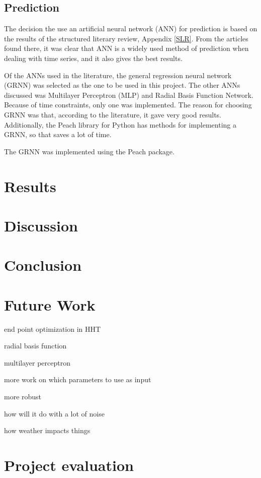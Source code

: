 \documentclass[12pt]{article}
\begin{document}
\subsection{Prediction}
\label{prediction}
The decision the use an artificial neural network (ANN) for prediction is based on the results of the structured literary review, Appendix \ref{SLR}. From the articles found there, it was clear that ANN is a widely used method of prediction when dealing with time series, and it also gives the best results. 

Of the ANNs used in the literature, the general regression neural network (GRNN) was selected as the one to be used in this project. The other ANNs discussed was Multilayer Perceptron (MLP) and Radial Basis Function Network. Because of time constraints, only one was implemented. The reason for choosing GRNN was that, according to the literature, it gave very good results. Additionally, the Peach library for Python has methods for implementing a GRNN, so that saves a lot of time.

The GRNN was implemented using the Peach package. 

\section{Results}
\label{results}



\section{Discussion}
\label{discussion}



\section{Conclusion}
\label{conclusion}




\section{Future Work}
\label{futureWork}

end point optimization in HHT

radial basis function

multilayer perceptron

more work on which parameters to use as input

more robust

how will it do with a lot of noise

how weather impacts things

\section{Project evaluation}
\label{projectEvaluation}




\newpage




\appendix



\end{document}
